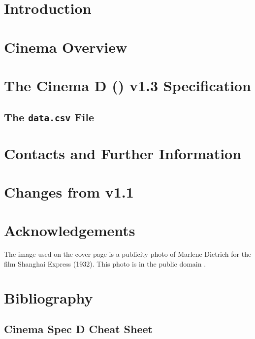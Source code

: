 \documentclass{article}
\newcommand{\version}[0]{1.3\xspace}
\begin{document}
\renewcommand\Authands{ and } 
 
\setcounter{secnumdepth}{5} 
\setcounter{tocdepth}{5} 
\newcommand{\subsubsubsection}[1]{\paragraph{#1}} 




\section{Introduction}
\label{intro}


\section{Cinema Overview}
\label{overview}


\newpage
\newpage
\section{The Cinema D (\dietrich) v\version Specification}
\label{dietrich}


\subsection{The \texttt{data.csv} File}
\label{csv}


\section{Contacts and Further Information}
\label{contacts}


\section{Changes from v1.1}
\label{changes}


\section{Acknowledgements}
The image used on the cover page is a publicity photo of Marlene Dietrich for the film Shanghai Express (1932). This  photo is in the public domain \cite{dietrich}.

\newpage
\section{Bibliography}



\newpage
\begin{appendices}
\section{Cinema Spec D Cheat Sheet}

\end{appendices}
\end{document}
